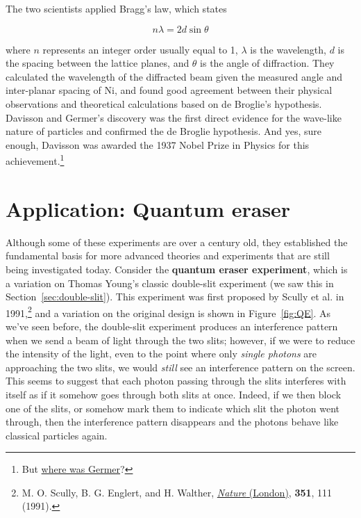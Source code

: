 The two scientists applied Bragg's law, which states 

\begin{tcolorbox}[title=Bragg's law] \vspace{-2ex}
	\begin{equation}
		n\lambda = 2d\sin\theta \label{eq:bragg}
	\end{equation}
\end{tcolorbox}

where $n$ represents an integer order usually equal to 1, $\lambda$ is the wavelength, $d$ is the spacing between the lattice planes, and $\theta$ is the angle of diffraction. They calculated the wavelength of the diffracted beam given the measured angle and inter-planar spacing of Ni, and found good agreement between their physical observations and theoretical calculations based on de Broglie's hypothesis. Davisson and Germer's discovery was the first direct evidence for the wave-like nature of particles and confirmed the de Broglie hypothesis. And yes, sure enough, Davisson was awarded the 1937 Nobel Prize in Physics for this achievement.\footnote{But \href{http://www.nobelprize.org/nobel\_prizes/physics/laureates/1937/press.html}{where was Germer}?}


\section{Application: Quantum eraser}
Although some of these experiments are over a century old, they established the fundamental basis for more advanced theories and experiments that are still being investigated today. Consider the \textbf{quantum eraser experiment}, which is a variation on Thomas Young's classic double-slit experiment (we saw this in Section~\ref{sec:double-slit}). This experiment was first proposed by Scully et al. in 1991,\footnote{M. O. Scully, B. G. Englert, and H. Walther, \href{https://www.nature.com/nature/journal/v351/n6322/abs/351111a0.html}{\emph{Nature} (London)}, \textbf{351}, 111 (1991).} and a variation on the original design is shown in Figure~\ref{fig:QE}. As we've seen before, the double-slit experiment produces an interference pattern when we send a beam of light through the two slits; however, if we were to reduce the intensity of the light, even to the point where only \emph{single photons} are approaching the two slits, we would \emph{still} see an interference pattern on the screen. This seems to suggest that each photon passing through the slits interferes with itself as if it somehow goes through both slits at once. Indeed, if we then block one of the slits, or somehow mark them to indicate which slit the photon went through, then the interference pattern disappears and the photons behave like classical particles again. \par

